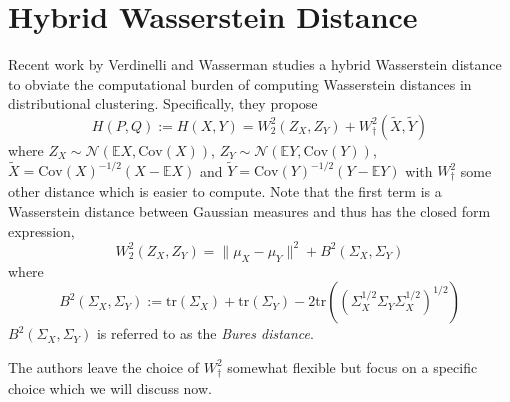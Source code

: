 \documentclass[11pt, a4paper, fleqn]{article}
\numberwithin{equation}{section}
\numberwithin{figure}{section}
\numberwithin{table}{section}
\begin{document}
\section{Hybrid Wasserstein Distance}\label{sec:hybrid_wasserstein_distance}
Recent work by Verdinelli and Wasserman \cite{verdinelli2018hybrid} studies a hybrid Wasserstein distance to obviate the computational burden of computing Wasserstein distances in distributional clustering. Specifically, they propose
\begin{equation}
H(P, Q) := H(X, Y) = W_2^2(Z_X, Z_Y) + W_{\dagger}^2(\tilde{X}, \tilde{Y})
\end{equation}
where $Z_X \sim \mathcal{N}(\mathbb{E}X, \mbox{Cov}(X))$, $Z_Y \sim\mathcal{N}(\mathbb{E}Y, \mbox{Cov}(Y))$, $\tilde{X} = \mbox{Cov}(X)^{-1/2}(X - \mathbb{E}X)$ and $\tilde{Y} = \mbox{Cov}(Y)^{-1/2}(Y - \mathbb{E}Y)$ with $W_\dagger^2$ some other distance which is easier to compute. Note that the first term is a Wasserstein distance between Gaussian measures and thus has the closed form expression,
\begin{equation}
W_2^2(Z_X, Z_Y) = \|\mu_X - \mu_Y\|^2 +B^2(\Sigma_X, \Sigma_Y)
\end{equation}
where
\begin{equation}
 B^2(\Sigma_X, \Sigma_Y) := \mbox{tr}(\Sigma_X) + \mbox{tr}(\Sigma_Y) - 2\mbox{tr}((\Sigma_X^{1/2} \Sigma_Y \Sigma_X^{1/2})^{1/2})
\end{equation}
$B^2(\Sigma_X, \Sigma_Y)$ is referred to as the \textit{Bures distance}. 

The authors leave the choice of $W_\dagger^2$ somewhat flexible but focus on a specific choice which we will discuss now.
\end{document}
